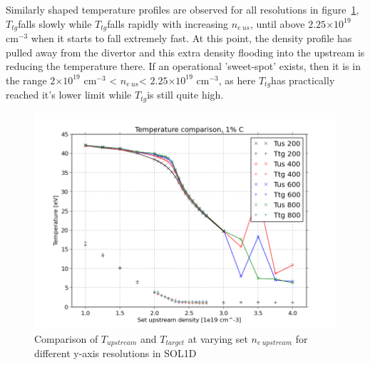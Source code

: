 \documentclass[11pt, twocolumn]{article}  %
\providecommand{\e}[1]{\ensuremath{\times 10^{#1}}} %
\providecommand{\neus}{$n_{e~us}$} %
\providecommand{\Tus}{$T_{tg}$} %
\providecommand{\Ttg}{$T_{tg}$} %
\begin{document}
Similarly shaped temperature profiles are observed for all resolutions in figure~\ref{fig:TT_IMPCOMBO2}, \Tus falls slowly while \Ttg falls rapidly with increasing \neus, until above $2.25\e{19}$ cm$^{-3}$ when it starts to fall extremely fast. At this point, the density profile has pulled away from the divertor and this extra density flooding into the upstream is reducing the temperature there. If an operational 'sweet-spot' exists, then it is in the range $2\e{19}$ cm$^{-3}$ < \neus < $2.25\e{19}$ cm$^{-3}$, as here \Ttg has practically reached it's lower limit while \Tus is still quite high.

\begin{figure}
\includegraphics[scale=0.5]{Figures/sol1d/TT_IMPCOMBO2.png}
\centering
\caption{Comparison of $T_{upstream}$ and $T_{target}$ at varying set $n_{e~upstream}$ for different y-axis resolutions in SOL1D}\label{fig:TT_IMPCOMBO2}
\end{figure}
\end{document}

